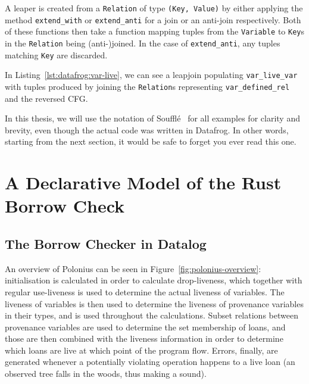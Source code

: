 \documentclass[11pt,a4paper,twoside,openany]{report}
\newcommand{\fixme}[1] {{\color{red}#1}}
\newcommand{\InRust}[1]{\texttt{#1}}
\begin{document}
A leaper is created from a \InRust{Relation} of type \InRust{(Key, Value)} by
either applying the method \InRust{extend_with} or \InRust{extend_anti} for a
join or an anti-join respectively. Both of these functions then take a function
mapping tuples from the \InRust{Variable} to \InRust{Key}s in the
\InRust{Relation} being (anti-)joined. In the case of \InRust{extend_anti}, any
tuples matching \InRust{Key} are discarded.

In Listing~\ref{lst:datafrog:var-live}, we can see a leapjoin populating
\InRust{var_live_var} with tuples produced by joining the \InRust{Relation}s
representing \InRust{var_defined_rel} and the reversed CFG.

In this thesis, we will use the notation of Souffl{\'e}~\cite{scholz_fast_2016}
for all examples for clarity and brevity, even though the actual code was
written in Datafrog. In other words, starting from the next section, it would be
safe to forget you ever read this one.

\chapter{A Declarative Model of the Rust Borrow Check}
\label{cha:investigation}

\section{The Borrow Checker in Datalog}\label{sec:borr-check-datal}

An overview of Polonius can be seen in Figure~\ref{fig:polonius-overview}:
initialisation is calculated in order to calculate drop-liveness, which together
with regular use-liveness is used to determine the actual liveness of variables.
The liveness of variables is then used to determine the liveness of provenance
variables in their types, and is used throughout the calculations. Subset
relations between provenance variables are used to determine the set membership
of loans, and those are then combined with the liveness information in order to
determine which loans are live at which point of the program flow. Errors,
finally, are generated whenever a potentially violating operation happens to a
live loan (an observed tree falls in the woods, thus making a sound).
\end{document}
